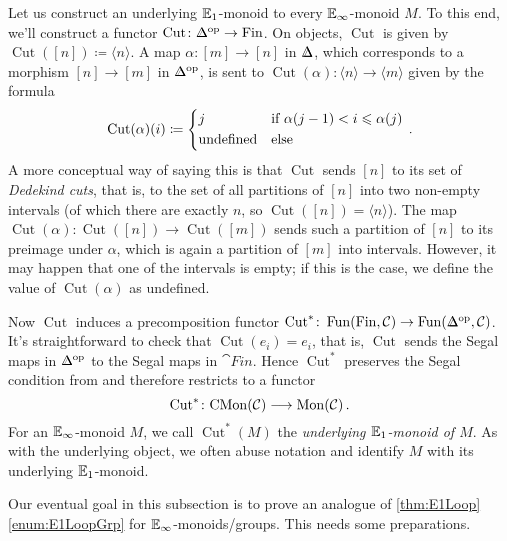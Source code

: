 \begin{con}\label{con:EinftyUnderlyingE1}
	Let us construct an underlying $\mathbb{E}_1$-monoid to every $\mathbb{E}_\infty$-monoid $M$. To this end, we'll construct a functor $\operatorname{Cut}\colon \IDelta^\op\rightarrow\cat{Fin}$. On objects, $\operatorname{Cut}$ is given by $\operatorname{Cut}([n])\coloneqq\langle n\rangle $. A map $\alpha\colon [m]\rightarrow [n]$ in $\IDelta$, which corresponds to a morphism $[n]\rightarrow [m]$ in $\IDelta^\op$, is sent to $\operatorname{Cut}(\alpha)\colon \langle n\rangle \rightarrow\langle m\rangle$ given by the formula
	\begin{equation*}
		\operatorname{Cut}(\alpha)(i)\coloneqq \begin{cases*}
			j & if $\alpha(j-1)< i\leqslant \alpha(j)$\\
			\text{undefined} & else
		\end{cases*}\,.
	\end{equation*}
	A more conceptual way of saying this is that $\operatorname{Cut}$ sends $[n]$ to its set of \emph{Dedekind cuts}, that is, to the set of all partitions of $[n]$ into two non-empty intervals (of which there are exactly $n$, so $\operatorname{Cut}([n])=\langle n\rangle $). The map $\operatorname{Cut}(\alpha)\colon \operatorname{Cut}([n])\rightarrow\operatorname{Cut}([m])$ sends such a partition of $[n]$ to its preimage under $\alpha$, which is again a partition of $[m]$ into intervals. However, it may happen that one of the intervals is empty; if this is the case, we define the value of $\operatorname{Cut}(\alpha)$ as undefined.
	
	Now $\operatorname{Cut}$ induces a precomposition functor $\operatorname{Cut}^*\colon \Fun(\cat{Fin},\Cc)\rightarrow\Fun(\IDelta^\op,\Cc)$. It's straightforward to check that $\operatorname{Cut}(e_i)=e_i$, that is, $\operatorname{Cut}$ sends the Segal maps in $\IDelta^\op$ to the Segal maps in $\cat{Fin}$. Hence $\operatorname{Cut}^*$ preserves the Segal condition from and therefore restricts to a functor
	\begin{equation*}
		\operatorname{Cut}^*\colon \mathrm{CMon}(\mathcal{C})\longrightarrow\mathrm{Mon}(\mathcal{C})\,.
	\end{equation*}
	For an $\mathbb{E}_\infty$-monoid $M$, we call $\operatorname{Cut}^*(M)$ the \emph{underlying $\mathbb{E}_1$-monoid of $M$}. As with the underlying object, we often abuse notation and identify $M$ with its underlying $\mathbb{E}_1$-monoid.
\end{con}
Our eventual goal in this subsection is to prove an analogue of \cref{thm:E1Loop}\cref{enum:E1LoopGrp} for $\mathbb{E}_\infty$-monoids/groups. This needs some preparations.
